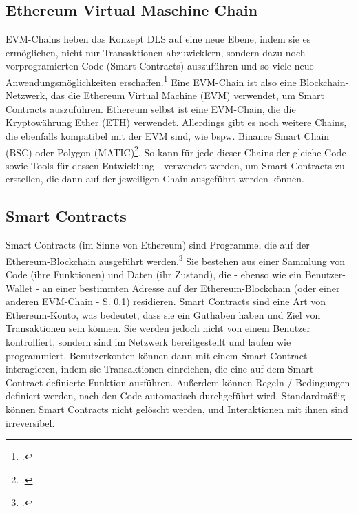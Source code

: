 \documentclass[12pt, a4paper]{article}
\begin{document}
{\subsection{Ethereum Virtual Maschine Chain}
\label{sec:definition-evm-chain}
EVM-Chains heben das Konzept DLS auf eine neue Ebene, indem sie es ermöglichen, nicht nur Transaktionen abzuwicklern, sondern dazu noch vorprogramierten Code (Smart Contracts) auszuführen und so viele neue Anwendungsmöglichkeiten erschaffen.\footcite[Vgl. hierzu und zum Folgenden][]{w5}
Eine EVM-Chain ist also eine Blockchain-Netzwerk, das die Ethereum Virtual Machine (EVM) verwendet, um Smart Contracts auszuführen.
Ethereum selbst ist eine EVM-Chain, die die Kryptowährung Ether (ETH) verwendet. Allerdings gibt es noch weitere Chains, die ebenfalls kompatibel mit der EVM sind, wie bspw. Binance Smart Chain (BSC) oder Polygon (MATIC)\footcite[Vgl.][]{w6}.
So kann für jede dieser Chains der gleiche Code - sowie Tools für dessen Entwicklung - verwendet werden, um Smart Contracts zu erstellen, die dann auf der jeweiligen Chain ausgeführt werden können.
\subsection{Smart Contracts}
\label{sec:definition-smart-contracts}
Smart Contracts (im Sinne von Ethereum) sind Programme, die auf der Ethereum-Blockchain ausgeführt werden.\footcite[Vgl. hierzu und zum Folgenden][]{w4} 
Sie bestehen aus einer Sammlung von Code (ihre Funktionen) und Daten (ihr Zustand), die - ebenso wie ein Benutzer-Wallet - an einer bestimmten Adresse auf der Ethereum-Blockchain (oder einer anderen EVM-Chain - S. \ref{sec:definition-evm-chain}) residieren.
Smart Contracts sind eine Art von Ethereum-Konto, was bedeutet, dass sie ein Guthaben haben und Ziel von Transaktionen sein können. 
Sie werden jedoch nicht von einem Benutzer kontrolliert, sondern sind im Netzwerk bereitgestellt und laufen wie programmiert. 
Benutzerkonten können dann mit einem Smart Contract interagieren, indem sie Transaktionen einreichen, die eine auf dem Smart Contract definierte Funktion ausführen. 
Außerdem können Regeln / Bedingungen definiert werden, nach den Code automatisch durchgeführt wird.
Standardmäßig können Smart Contracts nicht gelöscht werden, und Interaktionen mit ihnen sind irreversibel.
}
\end{document}
